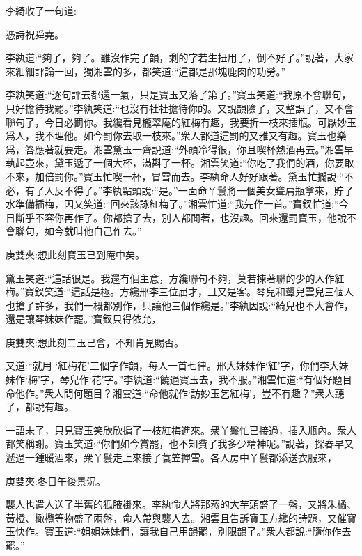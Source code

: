 \begin{parag}
    李綺收了一句道:
\end{parag}


\begin{poem}
    \begin{pl} 憑詩祝舜堯。\end{pl}
\end{poem}


\begin{parag}
    李紈道:“夠了，夠了。雖沒作完了韻，剩的字若生扭用了，倒不好了。”說著，大家來細細評論一回，獨湘雲的多，都笑道:“這都是那塊鹿肉的功勞。”
\end{parag}


\begin{parag}
    李紈笑道:“逐句評去都還一氣，只是寶玉又落了第了。”寶玉笑道:“我原不會聯句，只好擔待我罷。”李紈笑道:“也沒有社社擔待你的。又說韻險了，又整誤了，又不會聯句了，今日必罰你。我纔看見櫳翠庵的紅梅有趣，我要折一枝來插瓶。可厭妙玉爲人，我不理他。如今罰你去取一枝來。”衆人都道這罰的又雅又有趣。寶玉也樂爲，答應著就要走。湘雲黛玉一齊說道:“外頭冷得很，你且喫杯熱酒再去。”湘雲早執起壺來，黛玉遞了一個大杯，滿斟了一杯。湘雲笑道:“你吃了我們的酒，你要取不來，加倍罰你。”寶玉忙喫一杯，冒雪而去。李紈命人好好跟著。黛玉忙攔說:“不必，有了人反不得了。”李紈點頭說:“是。”一面命丫鬟將一個美女聳肩瓶拿來，貯了水準備插梅，因又笑道:“回來該詠紅梅了。”湘雲忙道:“我先作一首。”寶釵忙道:“今日斷乎不容你再作了。你都搶了去，別人都閒著，也沒趣。回來還罰寶玉，他說不會聯句，如今就叫他自己作去。”\begin{note}庚雙夾:想此刻寶玉已到庵中矣。\end{note}黛玉笑道:“這話很是。我還有個主意，方纔聯句不夠，莫若揀著聯的少的人作紅梅。”寶釵笑道:“這話是極。方纔邢李三位屈才，且又是客。琴兒和顰兒雲兒三個人也搶了許多，我們一概都別作，只讓他三個作纔是。”李紈因說:“綺兒也不大會作，還是讓琴妹妹作罷。”寶釵只得依允，\begin{note}庚雙夾:想此刻二玉已會，不知肯見賜否。\end{note}又道:“就用 ‘紅梅花’三個字作韻，每人一首七律。邢大妹妹作‘紅’字，你們李大妹妹作‘梅’字，琴兒作‘花’字。”李紈道:“饒過寶玉去，我不服。”湘雲忙道:“有個好題目命他作。”衆人問何題目？湘雲道:“命他就作‘訪妙玉乞紅梅’，豈不有趣？”衆人聽了，都說有趣。
\end{parag}


\begin{parag}
    一語未了，只見寶玉笑欣欣掮了一枝紅梅進來。衆丫鬟忙已接過，插入瓶內。衆人都笑稱謝。寶玉笑道:“你們如今賞罷，也不知費了我多少精神呢。”說著，探春早又遞過一鍾暖酒來，衆丫鬟走上來接了蓑笠撣雪。各人房中丫鬟都添送衣服來，\begin{note}庚雙夾:冬日午後景況。\end{note}襲人也遣人送了半舊的狐腋褂來。李紈命人將那蒸的大芋頭盛了一盤，又將朱橘、黃橙、橄欖等物盛了兩盤，命人帶與襲人去。湘雲且告訴寶玉方纔的詩題，又催寶玉快作。寶玉道:“姐姐妹妹們，讓我自己用韻罷，別限韻了。”衆人都說:“隨你作去罷。”
\end{parag}


